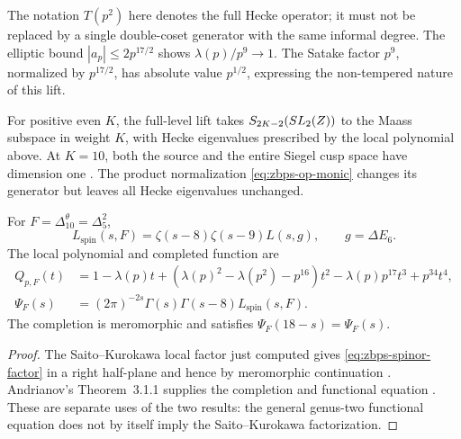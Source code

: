 The notation \(T(p^2)\) here denotes the full Hecke operator;
it must not be replaced by a single double-coset generator with
the same informal degree.  The elliptic bound
\(|a_p|\le2p^{17/2}\) shows \(\lambda(p)/p^9\to1\).
The Satake factor \(p^9\), normalized by \(p^{17/2}\), has
absolute value \(p^{1/2}\), expressing the non-tempered nature
of this lift.

\begin{remark}
\label{rem:zbps-sk-hecke-level0}
For positive even \(K\), the full-level lift takes
\(S_{2K-2}(SL_2(Z))\) to the Maass subspace in weight
\(K\), with Hecke eigenvalues prescribed by the local polynomial
above.  At \(K=10\), both the source
and the entire Siegel cusp space have dimension one
\cite[pp.~375, 379--381]{ZagierSK}.  The product normalization
\eqref{eq:zbps-op-monic} changes its generator but leaves all
Hecke eigenvalues unchanged.
\end{remark}

\begin{theorem}
\label{thm:zbps-andrianov-factor}
For \(F=\Delta_{10}^{\theta}=\Delta_5^2\),
\begin{equation}\label{eq:zbps-spinor-factor}
 L_{\mathrm{spin}}(s,F)=\zeta(s-8)\zeta(s-9)L(s,g),
 \qquad g=\Delta E_6.
\end{equation}
The local polynomial and completed function are
\begin{align*}
 Q_{p,F}(t)&=1-\lambda(p)t+
 (\lambda(p)^2-\lambda(p^2)-p^{16})t^2
 -\lambda(p)p^{17}t^3+p^{34}t^4,\\
 \Psi_F(s)&=(2\pi)^{-2s}\Gamma(s)\Gamma(s-8)
                         L_{\mathrm{spin}}(s,F).
\end{align*}
The completion is meromorphic and satisfies
\(\Psi_F(18-s)=\Psi_F(s)\).
\end{theorem}
\begin{proof}
The Saito--Kurokawa local factor just computed gives
\eqref{eq:zbps-spinor-factor} in a right half-plane and hence by
meromorphic continuation \cite[(10)--(11), Theorem~2]{ZagierSK}.
Andrianov's Theorem~3.1.1 supplies the completion and functional
equation \cite{Andr74}.  These are separate uses of the two
results: the general genus-two functional equation does not by
itself imply the Saito--Kurokawa factorization.
\end{proof}

